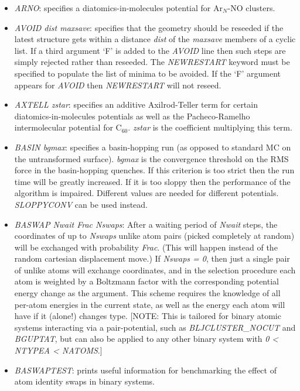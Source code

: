 \documentclass[12pt,a4paper,dvips]{article}
\begin{document}
\begin{itemize}
\item {\it ARNO\/}: specifies a diatomics-in-molecules potential for Ar$_N$-NO clusters.

\item {\it AVOID dist maxsave}: specifies that the geometry should be reseeded if the
latest structure gets within a distance {\it dist} of the {\it maxsave} members of a
cyclic list. If a third argument `F' is added to the {\it AVOID\/} line then such 
steps are simply rejected rather than reseeded.
The {\it NEWRESTART\/} keyword must be specified to populate the list of
minima to be avoided. If the `F' argument appears for {\it AVOID\/} then
{\it NEWRESTART\/} will not reseed.

\item {\it AXTELL zstar\/}: specifies an additive Axilrod-Teller term for certain
diatomics-in-molecules potentials as well as the Pacheco-Ramelho intermolecular potential for
C$_{60}$.\cite{pachecor97} 
{\it zstar\/} is the coefficient multiplying this term.

\item {\it BASIN bgmax\/}: specifies a basin-hopping run (as opposed to standard MC
on the untransformed surface). {\it bgmax\/} is the convergence threshold
on the RMS force in the basin-hopping
quenches. If this criterion is too strict then the run time will be greatly increased.
If it is too sloppy then the performance of the algorithm is impaired. Different values
are needed for different potentials. {\it SLOPPYCONV} can be used instead.

\item {\it BASWAP Nwait Frac Nswaps\/}: After a waiting period of {\it Nwait\/} steps, the coordinates of up to {\it Nswaps\/} unlike atom pairs (picked completely at random) will be exchanged with probability {\it Frac\/}. (This will happen instead of the random cartesian displacement move.) If {\it Nswaps = 0\/}, then just a single pair of unlike atoms will exchange coordinates, and in the selection procedure each atom is weighted by a Boltzmann factor with the corresponding potential energy change as the argument. This scheme requires the knowledge of all per-atom energies in the current state, as well as the energy each atom will have if it (alone!) changes type. [NOTE: This is tailored for binary atomic systems interacting via a pair-potential, such as {\it BLJCLUSTER\_NOCUT\/} and {\it BGUPTAT\/}, but can also be applied to any other binary system with {\it 0 < NTYPEA < NATOMS\/}.]

\item {\it BASWAPTEST}: prints useful information for benchmarking the effect of atom identity swaps in binary systems.


\end{itemize}
\end{document}
